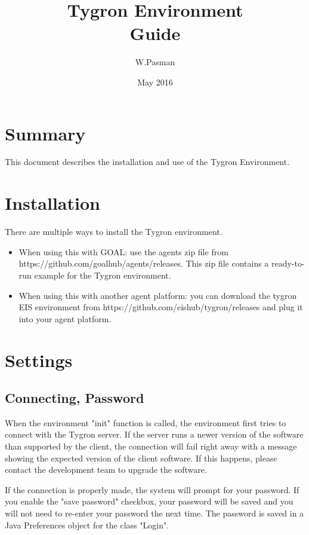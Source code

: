 \documentclass[english,11pt]{article}
\title{Tygron Environment \\ Guide}
\author{W.Pasman}
\date{May 2016}
\begin{document}
\maketitle

\newpage
\tableofcontents
\newpage

\section{Summary}

This document describes the installation and use of the Tygron Environment.

\section{Installation}
There are multiple ways to install the Tygron environment. 
\begin{itemize}
\item When using this with GOAL: use the agents zip file from https://github.com/goalhub/agents/releases. This zip file contains a ready-to-run example for the Tygron environment. 
\item When using this with another agent platform: you can download the tygron EIS environment from https://github.com/eishub/tygron/releases and plug it into your agent platform. 
\end{itemize}

\section{Settings}
\subsection{Connecting, Password}
When the environment "init" function is called, the environment first tries to connect with the Tygron server.
If the server runs a newer version of the software than supported by the client, the connection will fail right away with a message showing the expected version of the client software. If this happens, please contact the development team to upgrade the software.

If the connection is properly made, the system will prompt for your password. If you enable the "save password" checkbox, your password will be saved and you will not need to re-enter your password the next time. The password is saved in a Java Preferences object for the class "Login".
\end{document}
